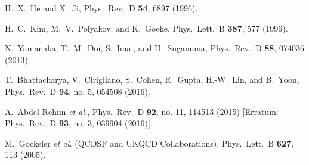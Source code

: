 \documentclass[aps,prd,twocolumn,groupedaddress,showpacs,superscriptaddress,floatfix,nofootinbib,10pt]{revtex4-1}
\begin{document}
\begin{thebibliography}{}
  H.~X.~He and X.~Ji,
  Phys.\ Rev.\ D {\bf 54}, 6897 (1996).


  H.~C.~Kim, M.~V.~Polyakov, and K.~Goeke,
  Phys.\ Lett.\ B {\bf 387}, 577 (1996).


  N.~Yamanaka, T.~M.~Doi, S.~Imai, and H.~Suganuma,
  Phys.\ Rev.\ D {\bf 88}, 074036 (2013).


  T.~Bhattacharya, V.~Cirigliano, S.~Cohen, R.~Gupta, H.-W.~Lin, and B.~Yoon,
  Phys.\ Rev.\ D {\bf 94}, no. 5, 054508 (2016).


  A.~Abdel-Rehim {\it et al.},
  Phys.\ Rev.\ D {\bf 92}, no. 11, 114513 (2015)
  [Erratum: Phys.\ Rev.\ D {\bf 93}, no. 3, 039904 (2016)].


  M.~Gockeler {\it et al.} (QCDSF and UKQCD Collaborations),
  Phys.\ Lett.\ B {\bf 627}, 113 (2005).



\end{thebibliography}
\end{document}
